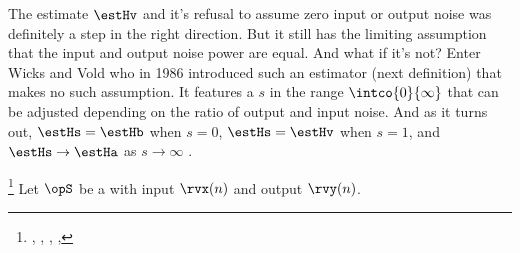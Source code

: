 The estimate $\estHv$ and it's refusal to assume zero input or output noise
was definitely a step in the right direction.
But it still has the limiting assumption that the input and output noise power are equal.
And what if it's not?
Enter Wicks and Vold who in 1986 introduced such an estimator (next definition)
that makes no such assumption.
It features a  $s$ in the range $\intco{0}{\infty}$
that can be adjusted depending on the ratio of output and input noise.
And as it turns out, $\estHs = \estHb$ when $s=0$, $\estHs=\estHv$ when $s=1$, and
$\estHs\to\estHa$ as $s\to\infty$  .
\begin{definition}                                                                %
\footnote{                                                                        %
  ,         %
  ,                        %
  ,           %
  ,
  }                                                                               %
\label{def:Hs}                                                                    %
Let $\opS$ be a  with input $\rvx(n)$ and output $\rvy(n)$.
\end{definition}
